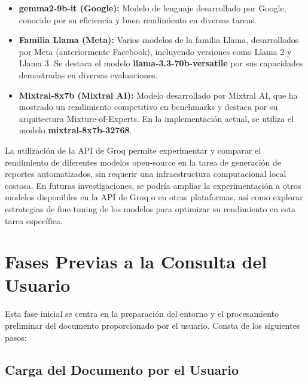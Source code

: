 \begin{itemize}
	\item \textbf{gemma2-9b-it (Google):}  Modelo de lenguaje desarrollado por Google,  conocido por su eficiencia y buen rendimiento en diversas tareas.
	\item \textbf{Familia Llama (Meta):}  Varios modelos de la familia Llama,  desarrollados por Meta (anteriormente Facebook),  incluyendo versiones como Llama 2 y Llama 3.  Se destaca el modelo \textbf{llama-3.3-70b-versatile} por sus capacidades demostradas en diversas evaluaciones.
	\item \textbf{Mixtral-8x7b (Mixtral AI):}  Modelo desarrollado por Mixtral AI,  que ha mostrado un rendimiento competitivo en benchmarks y destaca por su arquitectura Mixture-of-Experts.  En la implementación actual,  se utiliza el modelo \textbf{mixtral-8x7b-32768}.
\end{itemize}
La utilización de la API de Groq permite experimentar y comparar el rendimiento de diferentes modelos open-source en la tarea de generación de reportes automatizados,  sin requerir una infraestructura computacional local costosa. En futuras investigaciones,  se podría ampliar la experimentación a otros modelos disponibles en la API de Groq o en otras plataformas,  así como explorar estrategias de fine-tuning de los modelos para optimizar su rendimiento en esta tarea específica.



\section{Fases Previas a la Consulta del Usuario}

Esta fase inicial se centra en la preparación del entorno y el procesamiento preliminar del documento proporcionado por el usuario. Consta de los siguientes pasos:

\subsection{Carga del Documento por el Usuario}

